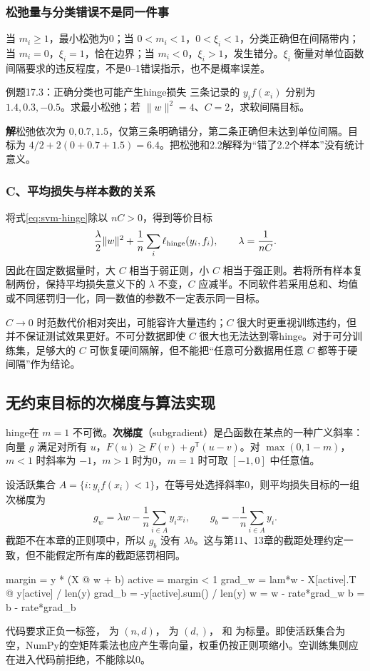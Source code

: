 \documentclass[UTF8,fontset=none,zihao=-4,a4paper]{ctexart}
\newcommand{\term}[1]{\textbf{#1}}
\newcommand{\sol}{\par\noindent\textbf{解}\quad}
\newcommand{\code}[1]{\texttt{\detokenize{#1}}}
\numberwithin{equation}{section}
\numberwithin{figure}{section}
\begin{document}
\subsubsection{松弛量与分类错误不是同一件事}
当 $m_i\ge1$，最小松弛为0；当 $0<m_i<1$，$0<\xi_i<1$，分类正确但在间隔带内；当 $m_i=0$，$\xi_i=1$，恰在边界；当 $m_i<0$，$\xi_i>1$，发生错分。$\xi_i$ 衡量对单位函数间隔要求的违反程度，不是0--1错误指示，也不是概率误差。

\begin{infobox}[unbreakable]{例题17.3：正确分类也可能产生hinge损失}
三条记录的 $y_if(x_i)$ 分别为 $1.4,0.3,-0.5$。求最小松弛；若 $\|w\|^2=4$、$C=2$，求软间隔目标。
\sol 松弛依次为 $0,0.7,1.5$，仅第三条明确错分，第二条正确但未达到单位间隔。目标为 $4/2+2(0+0.7+1.5)=6.4$。把松弛和2.2解释为“错了2.2个样本”没有统计意义。
\end{infobox}

\subsubsection{C、平均损失与样本数的关系}
将式\eqref{eq:svm-hinge}除以 $nC>0$，得到等价目标
\[
 \frac\lambda2\|w\|^2+\frac1n\sum_i\ell_{\rm hinge}(y_i,f_i),
 \qquad \lambda=\frac1{nC}.
\]
因此在固定数据量时，大 $C$ 相当于弱正则，小 $C$ 相当于强正则。若将所有样本复制两份，保持平均损失意义下的 $\lambda$ 不变，$C$ 应减半。不同软件若采用总和、均值或不同惩罚归一化，同一数值的参数不一定表示同一目标。

$C\to0$ 时范数代价相对突出，可能容许大量违约；$C$ 很大时更重视训练违约，但并不保证测试效果更好。不可分数据即使 $C$ 很大也无法达到零hinge。对于可分训练集，足够大的 $C$ 可恢复硬间隔解，但不能把“任意可分数据用任意 $C$ 都等于硬间隔”作为结论。

\subsection{无约束目标的次梯度与算法实现}
hinge在 $m=1$ 不可微。\term{次梯度}（subgradient）是凸函数在某点的一种广义斜率：向量 $g$ 满足对所有 $u$，$F(u)\ge F(v)+g^{\mathsf T}(u-v)$。对 $\max(0,1-m)$，$m<1$ 时斜率为 $-1$，$m>1$ 时为0，$m=1$ 时可取 $[-1,0]$ 中任意值。

设活跃集合 $A=\{i:y_if(x_i)<1\}$，在等号处选择斜率0，则平均损失目标的一组次梯度为
\[
 g_w=\lambda w-\frac1n\sum_{i\in A}y_ix_i,
 \qquad g_b=-\frac1n\sum_{i\in A}y_i.
\]
截距不在本章的正则项中，所以 $g_b$ 没有 $\lambda b$。这与第11、13章的截距处理约定一致，但不能假定所有库的截距惩罚相同。
\begin{pycode}
margin = y * (X @ w + b)
active = margin < 1
grad_w = lam*w - X[active].T @ y[active] / len(y)
grad_b = -y[active].sum() / len(y)
w = w - rate*grad_w
b = b - rate*grad_b
\end{pycode}
代码要求正负一标签，\code{X} 为 $(n,d)$，\code{w} 为 $(d,)$，\code{b} 和 \code{lam} 为标量。即使活跃集合为空，NumPy的空矩阵乘法也应产生零向量，权重仍按正则项缩小。空训练集则应在进入代码前拒绝，不能除以0。
\end{document}
